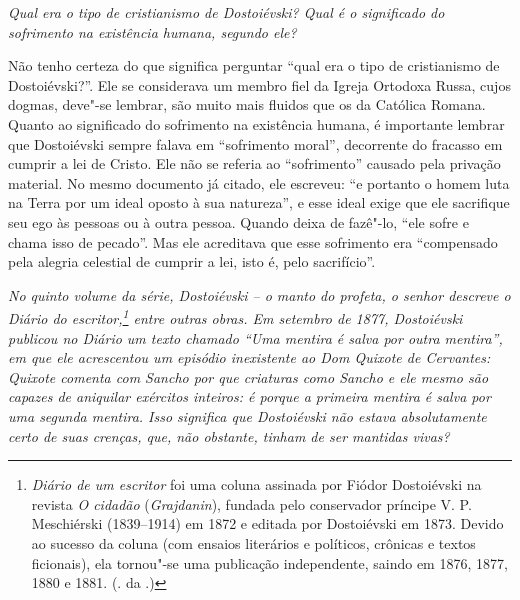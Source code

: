 \medskip

\emph{Qual era o tipo de cristianismo de Dostoiévski? Qual é o significado
do sofrimento na existência humana, segundo ele?}

Não tenho certeza do que significa perguntar ``qual era o tipo de
cristianismo de Dostoiévski?''. Ele se considerava um membro fiel da
Igreja Ortodoxa Russa, cujos dogmas, deve"-se lembrar, são muito mais
fluidos que os da Católica Romana. Quanto ao significado do sofrimento
na existência humana, é importante lembrar que Dostoiévski sempre falava
em ``sofrimento moral'', decorrente do fracasso em cumprir a lei de
Cristo. Ele não se referia ao ``sofrimento'' causado pela privação
material. No mesmo documento já citado, ele escreveu: ``e portanto o homem
luta na Terra por um ideal oposto à sua natureza'', e esse
ideal exige que ele sacrifique seu ego às pessoas ou à outra pessoa.
Quando deixa de fazê"-lo, ``ele sofre e chama isso de pecado''. Mas ele
acreditava que esse sofrimento era ``compensado pela alegria celestial de
cumprir a lei, isto é, pelo sacrifício''.

\medskip

\emph{No quinto volume da série, \emph{Dostoiévski -- o manto do profeta}, o
senhor descreve o \emph{Diário do escritor},\footnote{\emph{Diário de um escritor} foi uma coluna assinada por Fiódor Dostoiévski na revista \emph{O cidadão} (\emph{Grajdanin}), fundada pelo conservador príncipe V. P. Meschiérski (1839--1914) em 1872 e editada por Dostoiévski em 1873. Devido ao sucesso da coluna (com ensaios literários e políticos, crônicas e textos ficionais), ela tornou"-se uma publicação independente, saindo em 1876, 1877, 1880 e 1881. (. da .)} entre outras obras.
Em setembro de 1877, Dostoiévski publicou no \emph{Diário} um texto
chamado ``Uma mentira é salva por outra mentira'', em que ele acrescentou
um episódio inexistente ao \emph{Dom Quixote} de Cervantes: Quixote comenta
com Sancho por que criaturas como Sancho e ele mesmo são capazes de aniquilar exércitos
inteiros: é porque a primeira mentira é salva por uma segunda mentira.
Isso significa que Dostoiévski não estava absolutamente certo de suas
crenças, que, não obstante, tinham de ser mantidas vivas?}

